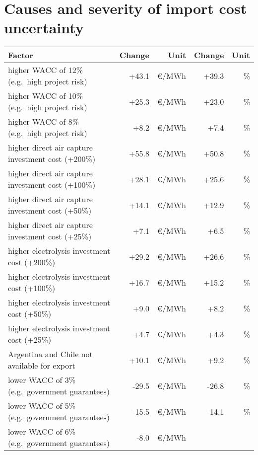 
\section*{Causes and severity of import cost uncertainty}


\begin{table*}[!htb]
    \footnotesize
    \centering
    \begin{tabular}{lrrrr}
        \toprule
        Factor & Change & Unit & Change & Unit\\
        \midrule
        higher WACC of 12\% (e.g.~high project risk) & +43.1 & \euro{}/MWh  &
        +39.3 & \% \\
        higher WACC of 10\% (e.g.~high project risk) & +25.3 & \euro{}/MWh  &
        +23.0 & \% \\
        higher WACC of 8\% (e.g.~high project risk) & +8.2 & \euro{}/MWh  & +7.4
        & \% \\
        higher direct air capture investment cost (+200\%) & +55.8 & \euro{}/MWh
        & +50.8 & \% \\
        higher direct air capture investment cost (+100\%) & +28.1 & \euro{}/MWh
        & +25.6 & \% \\
        higher direct air capture investment cost (+50\%) & +14.1 & \euro{}/MWh
        & +12.9 & \% \\
        higher direct air capture investment cost (+25\%) & +7.1 & \euro{}/MWh &
        +6.5 & \% \\
        higher electrolysis investment cost (+200\%) & +29.2 & \euro{}/MWh  &
        +26.6 & \% \\
        higher electrolysis investment cost (+100\%) & +16.7 & \euro{}/MWh  &
        +15.2 & \% \\
        higher electrolysis investment cost (+50\%) & +9.0 & \euro{}/MWh  & +8.2
        & \% \\
        higher electrolysis investment cost (+25\%) & +4.7 & \euro{}/MWh  & +4.3
        & \% \\
        Argentina and Chile not available for export & +10.1 & \euro{}/MWh  &
        +9.2 & \% \\
        \midrule
        lower WACC of 3\% (e.g.~government guarantees) & -29.5 & \euro{}/MWh  &
        -26.8 & \% \\
        lower WACC of 5\% (e.g.~government guarantees) & -15.5 & \euro{}/MWh  &
        -14.1 & \% \\
        lower WACC of 6\% (e.g.~government guarantees) & -8.0 & \euro{}/MWh  &

\end{tabular}
\end{table*}
